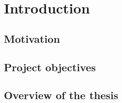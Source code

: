 \chapter{Introduction}
\label{chp:introduction} 
\section{\label{sec:motivation}Motivation}


\section{Project objectives}


\section{Overview of the thesis}
